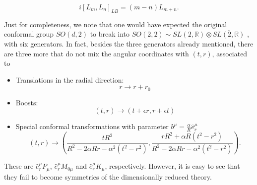 \documentclass[12pt,a4paper]{article}
\begin{document}
\begin{equation}
i\left[L_m,L_n\right]_{LB}=(m-n)L_{m+n}.
\end{equation}

Just for completeness, we note that one would have expected the original conformal group $SO(d,2)$ to break into $SO(2,2)\sim SL(2,\mathbb{R})\otimes \overline{SL(2,\mathbb{R})}$ \cite{Jackiw:2011vz,Chamon:2011xk}, with six generators. In fact, besides the three generators already mentioned, there are three more that do not mix the angular coordinates with $(t,r)$, associated to 
\begin{itemize}
\item Translations in the radial direction: 
\begin{equation}
r\rightarrow r+ r_0
\end{equation}

\item Boosts: 
\begin{equation}
(t,r)\rightarrow (t+ \epsilon r,r+\epsilon t)
\end{equation}

\item Special conformal transformations with parameter $b^{\mu}= \frac{\alpha}{R}\hat{e}^{\mu}_r$
\begin{equation}
(t,r)\rightarrow \left(\frac{t R^2}{R^2-2\alpha R r - \alpha^2 (t^2 -r^2)}, \frac{r R^2+\alpha R (t^2-r^2)}{R^2-2\alpha R r- \alpha^2 (t^2-r^2)}\right).
\end{equation}
\end{itemize}
These are $\hat{e}^{\mu}_r P_{\mu}$, $\hat{e}^{\mu}_r M_{0 \mu}$ and $\hat{e}^{\mu}_r K_{\mu}$, respectively. However, it is easy to see that they fail to become symmetries of the dimensionally reduced theory. 
\end{document}
